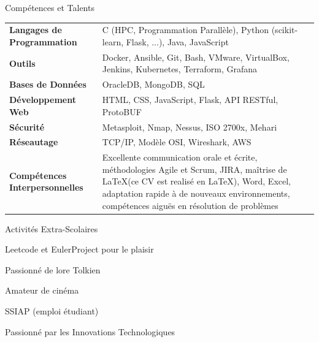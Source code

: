 \documentclass{resume}
\begin{document}
    \begin{rSection}{Compétences et Talents}
        \vspace{-0.25em}
        \begin{tabularx}{\textwidth}{ @{} >{\bfseries}l @{\hspace{3ex}} X @{} }
        Langages de Programmation & C (HPC, Programmation Parallèle), Python (scikit-learn, Flask, ...), Java, JavaScript \\
        
        Outils & Docker, Ansible, Git, Bash, VMware, VirtualBox, Jenkins, Kubernetes, Terraform, Grafana \\
        
        Bases de Données & OracleDB, MongoDB, SQL \\
        
        Développement Web & HTML, CSS, JavaScript, Flask, API RESTful, ProtoBUF \\
        
        Sécurité & Metasploit, Nmap, Nessus, ISO 2700x, Mehari \\
        
        Réseautage & TCP/IP, Modèle OSI, Wireshark, AWS \\
        
        Compétences Interpersonnelles & Excellente communication orale et écrite, méthodologies Agile et Scrum, JIRA, maîtrise de LaTeX(ce CV est realisé en LaTeX), Word, Excel, adaptation rapide à de nouveaux environnements, compétences aiguës en résolution de problèmes \\
        
        \end{tabularx}
    \end{rSection}
    \vspace{-0.75em}
    
    \begin{rSection}{Activités Extra-Scolaires} 
        \vspace{-0.25em}
        \begin{enumerate*}
            \item Leetcode et EulerProject pour le plaisir
            \item Passionné de lore Tolkien
            \item Amateur de cinéma
            \item SSIAP (emploi étudiant)
            \item Passionné par les Innovations Technologiques
        \end{enumerate*}
    \end{rSection}
\end{document}
